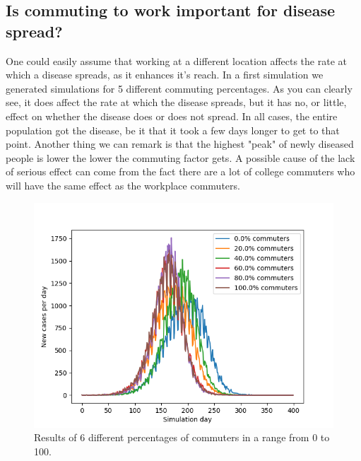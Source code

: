 \documentclass[runningheads]{llncs}
\begin{document}
\subsection{Is commuting to work important for disease spread?}
One could easily assume that working at a different location affects the rate at which a disease spreads, as it enhances it's reach. In a first simulation we generated simulations for 5 different commuting percentages. As you can clearly see, it does affect the rate at which the disease spreads, but it has no, or little, effect on whether the disease does or does not spread. In all cases, the entire population got the disease, be it that it took a few days longer to get to that point. Another thing we can remark is that the highest "peak" of newly diseased people is lower the lower the commuting factor gets. A possible cause of the lack of serious effect can come from the fact there are a lot of college commuters who will have the same effect as the workplace commuters. 

\begin{figure}
	\includegraphics[width=\textwidth]{test_0-100.png}
	\caption{Results of 6 different percentages of commuters in a range from 0 to 100.}
\end{figure}
\newpage
\end{document}
